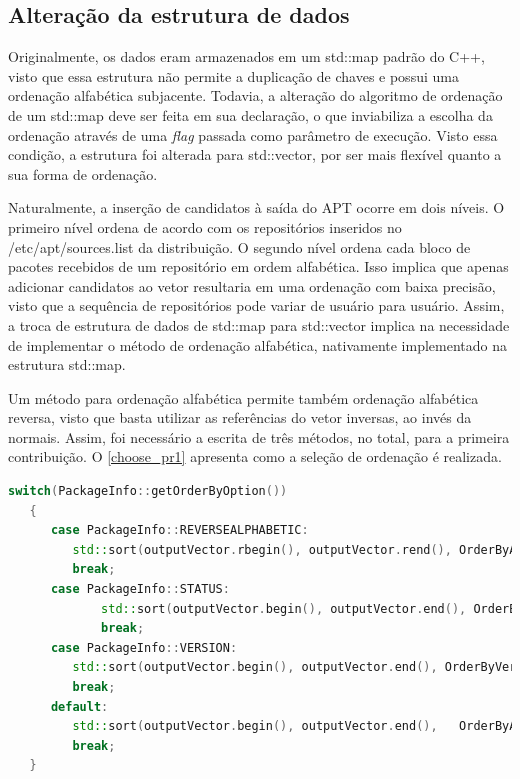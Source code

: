 \subsection*{Alteração da estrutura de dados} %
\label{sub:altera_o_da_estrutuda_de_dados}

Originalmente, os dados eram armazenados em um {\code std::map} padrão do {\code C++}, visto que essa estrutura não permite a duplicação de chaves e possui uma ordenação alfabética subjacente. Todavia, a alteração do algoritmo de ordenação de um {\code std::map} deve ser feita em sua declaração, o que inviabiliza a escolha da ordenação através de uma \textit{flag} passada como parâmetro de execução. Visto essa condição, a estrutura foi alterada para {\code std::vector}, por ser mais flexível quanto a sua forma de ordenação.

Naturalmente, a inserção de candidatos à saída do {\code APT} ocorre  em dois níveis. O primeiro nível ordena de acordo com os repositórios inseridos no {\code /etc/apt/sources.list} da distribuição. O segundo nível ordena cada bloco de pacotes recebidos de um repositório em ordem alfabética. Isso implica que apenas adicionar candidatos ao vetor resultaria em uma ordenação com baixa precisão, visto que a sequência de repositórios pode variar de usuário para usuário. Assim, a  troca de estrutura de dados de {\code std::map} para {\code std::vector} implica na necessidade de implementar o método de ordenação alfabética, nativamente implementado na estrutura {\code std::map}.

Um método para ordenação alfabética permite também ordenação alfabética reversa, visto que basta utilizar as referências do vetor inversas, ao invés da normais. Assim, foi necessário a escrita de três métodos, no total, para a primeira contribuição. O \autoref{choose_pr1} apresenta como a seleção de ordenação é realizada.


\begin{lstlisting}[language=C++,label=choose_pr1,caption={Tomada de decisão de ordenação}]
   switch(PackageInfo::getOrderByOption())
   {
      case PackageInfo::REVERSEALPHABETIC:
		 std::sort(outputVector.rbegin(), outputVector.rend(), OrderByAlphabetic);
		 break;
      case PackageInfo::STATUS:
			 std::sort(outputVector.begin(), outputVector.end(), OrderByStatus);
			 break;
      case PackageInfo::VERSION:
		 std::sort(outputVector.begin(), outputVector.end(), OrderByVersion);
		 break;
      default:
		 std::sort(outputVector.begin(), outputVector.end(),   OrderByAlphabetic);
		 break;
   }
\end{lstlisting}

